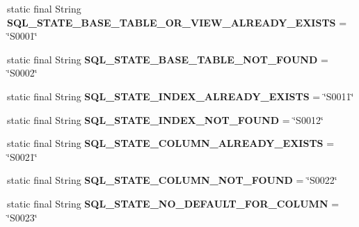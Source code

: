\begin{DoxyCompactItemize}
static final String {\bfseries S\+Q\+L\+\_\+\+S\+T\+A\+T\+E\+\_\+\+B\+A\+S\+E\+\_\+\+T\+A\+B\+L\+E\+\_\+\+O\+R\+\_\+\+V\+I\+E\+W\+\_\+\+A\+L\+R\+E\+A\+D\+Y\+\_\+\+E\+X\+I\+S\+TS} = \char`\"{}S0001\char`\"{}
\item 
\mbox{\label{classcom_1_1mysql_1_1cj_1_1exceptions_1_1_mysql_error_numbers_a0597483f741463d395b509d2c061c863}} 
static final String {\bfseries S\+Q\+L\+\_\+\+S\+T\+A\+T\+E\+\_\+\+B\+A\+S\+E\+\_\+\+T\+A\+B\+L\+E\+\_\+\+N\+O\+T\+\_\+\+F\+O\+U\+ND} = \char`\"{}S0002\char`\"{}
\item 
\mbox{\label{classcom_1_1mysql_1_1cj_1_1exceptions_1_1_mysql_error_numbers_a0545d09be55fd25ac4b286ab66aa03a5}} 
static final String {\bfseries S\+Q\+L\+\_\+\+S\+T\+A\+T\+E\+\_\+\+I\+N\+D\+E\+X\+\_\+\+A\+L\+R\+E\+A\+D\+Y\+\_\+\+E\+X\+I\+S\+TS} = \char`\"{}S0011\char`\"{}
\item 
\mbox{\label{classcom_1_1mysql_1_1cj_1_1exceptions_1_1_mysql_error_numbers_a84439d0103ca31be813b9d8ff5a4b9c4}} 
static final String {\bfseries S\+Q\+L\+\_\+\+S\+T\+A\+T\+E\+\_\+\+I\+N\+D\+E\+X\+\_\+\+N\+O\+T\+\_\+\+F\+O\+U\+ND} = \char`\"{}S0012\char`\"{}
\item 
\mbox{\label{classcom_1_1mysql_1_1cj_1_1exceptions_1_1_mysql_error_numbers_afc6d1f964177f915489a7b7d7bfec42f}} 
static final String {\bfseries S\+Q\+L\+\_\+\+S\+T\+A\+T\+E\+\_\+\+C\+O\+L\+U\+M\+N\+\_\+\+A\+L\+R\+E\+A\+D\+Y\+\_\+\+E\+X\+I\+S\+TS} = \char`\"{}S0021\char`\"{}
\item 
\mbox{\label{classcom_1_1mysql_1_1cj_1_1exceptions_1_1_mysql_error_numbers_a325895e355fa3da0d273bb6b72d0cc69}} 
static final String {\bfseries S\+Q\+L\+\_\+\+S\+T\+A\+T\+E\+\_\+\+C\+O\+L\+U\+M\+N\+\_\+\+N\+O\+T\+\_\+\+F\+O\+U\+ND} = \char`\"{}S0022\char`\"{}
\item 
\mbox{\label{classcom_1_1mysql_1_1cj_1_1exceptions_1_1_mysql_error_numbers_a351e3e1871750ae24c4ed9333e17206e}} 
static final String {\bfseries S\+Q\+L\+\_\+\+S\+T\+A\+T\+E\+\_\+\+N\+O\+\_\+\+D\+E\+F\+A\+U\+L\+T\+\_\+\+F\+O\+R\+\_\+\+C\+O\+L\+U\+MN} = \char`\"{}S0023\char`\"{}

\end{DoxyCompactItemize}
